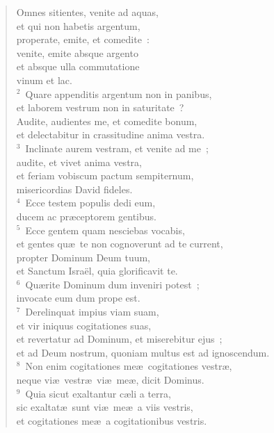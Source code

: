 \begin{flushleft}\begin{verse}\vspace{-19pt}\hspace{6pt}Omnes sitientes, venite ad aquas,\\\hspace{6pt} et qui non habetis argentum,\\ properate, emite, et comedite~:\\ venite, emite absque argento\\ et absque ulla commutatione\\ vinum et lac.\\
${}^{2}$~Quare appenditis argentum non in panibus,\\ et laborem vestrum non in saturitate~?\\ Audite, audientes me, et comedite bonum,\\ et delectabitur in crassitudine anima vestra.\\
${}^{3}$~Inclinate aurem vestram, et venite ad me~;\\ audite, et vivet anima vestra,\\ et feriam vobiscum pactum sempiternum,\\ misericordias David fideles.\\
${}^{4}$~Ecce testem populis dedi eum,\\ ducem ac pr\ae ceptorem gentibus.\\
${}^{5}$~Ecce gentem quam nesciebas vocabis,\\ et gentes qu\ae\ te non cognoverunt ad te current,\\ propter Dominum Deum tuum,\\ et Sanctum Isra\"el, quia glorificavit te.\\
${}^{6}$~Qu\ae rite Dominum dum inveniri potest~;\\ invocate eum dum prope est.\\
${}^{7}$~Derelinquat impius viam suam,\\ et vir iniquus cogitationes suas,\\ et revertatur ad Dominum, et miserebitur ejus~;\\ et ad Deum nostrum, quoniam multus est ad ignoscendum.\\
${}^{8}$~Non enim cogitationes me\ae\ cogitationes vestr\ae ,\\ neque vi\ae\ vestr\ae\ vi\ae\ me\ae , dicit Dominus.\\
${}^{9}$~Quia sicut exaltantur c\ae li a terra,\\ sic exaltat\ae\ sunt vi\ae\ me\ae\ a viis vestris,\\ et cogitationes me\ae\ a cogitationibus vestris.\\

\end{verse}
\end{flushleft}
